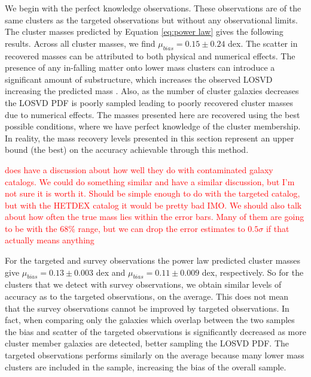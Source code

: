 \documentclass[fleqn,usenatbib]{mnras}
\newcommand{\editorial}[1]{\textcolor{red}{#1}}
\begin{document}
We begin with the perfect knowledge observations. These observations are of the same clusters as the targeted observations but without any observational limits. The cluster masses predicted by Equation \ref{eq:power law} gives the following results. Across all cluster masses, we find $\mu_{bias} = 0.15\pm{0.24}$ dex. The scatter in recovered masses can be attributed to both physical and numerical effects. The presence of any in-falling matter onto lower mass clusters can introduce a significant amount of substructure, which increases the observed LOSVD increasing the predicted mass . Also, as the number of cluster galaxies decreases the LOSVD PDF is poorly sampled leading to poorly recovered cluster masses due to numerical effects. The masses presented here are recovered using the best possible conditions, where we have perfect knowledge of the cluster membership. In reality, the mass recovery levels presented in this section represent an upper bound (the best) on the accuracy achievable through this method.

\editorial{\cite{Ntampaka2015} does have a discussion about how well they do with contaminated galaxy catalogs. We could do something similar and have a similar discussion, but I'm not sure it is worth it. Should be simple enough to do with the targeted catalog, but with the HETDEX catalog it would be pretty bad IMO. We should also talk about how often the true mass lies within the error bars. Many of them are going to be with the 68\% range, but we can drop the error estimates to $0.5\sigma$ if that actually means anything} 

For the targeted and survey observations the power law predicted cluster masses give $\mu_{bias} =0.13\pm{0.003}$ dex and $\mu_{bias} =0.11\pm{0.009}$ dex, respectively. So for the clusters that we detect with survey observations, we obtain similar levels of accuracy as to the targeted observations, on the average. This does not mean that the survey observations cannot be improved by targeted observations. In fact, when comparing only the galaxies which overlap between the two samples the bias and scatter of the targeted observations is significantly decreased as more cluster member galaxies are detected, better sampling the LOSVD PDF. The targeted observations performs similarly on the average because many lower mass clusters are included in the sample, increasing the bias of the overall sample.
\end{document}
